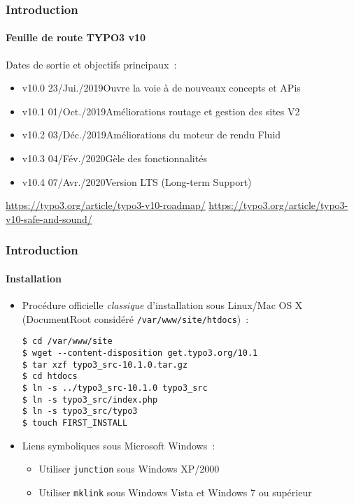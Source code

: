 
\begin{frame}[fragile]
	\frametitle{Introduction}
	\framesubtitle{Feuille de route TYPO3 v10}

	Dates de sortie et objectifs principaux~:

	\begin{itemize}

		\item v10.0 \tabto{1.1cm}23/Jui./2019\tabto{3.4cm}Ouvre la voie à de nouveaux concepts et APis
		\item
			\begingroup
				\color{typo3orange}
				v10.1 \tabto{1.1cm}01/Oct./2019\tabto{3.4cm}Améliorations routage et gestion des sites V2
			\endgroup
		\item v10.2 \tabto{1.1cm}03/Déc./2019\tabto{3.4cm}Améliorations du moteur de rendu Fluid
		\item v10.3 \tabto{1.1cm}04/Fév./2020\tabto{3.4cm}Gèle des fonctionnalités
		\item v10.4 \tabto{1.1cm}07/Avr./2020\tabto{3.4cm}Version LTS (Long-term Support)

	\end{itemize}

	\smaller
		\url{https://typo3.org/article/typo3-v10-roadmap/}\newline
		\url{https://typo3.org/article/typo3-v10-safe-and-sound/}
	\normalsize

\end{frame}


\begin{frame}[fragile]
	\frametitle{Introduction}
	\framesubtitle{Installation}

	\begin{itemize}
		\item Procédure officielle \textit{classique} d'installation sous Linux/Mac OS X\newline
			(DocumentRoot considéré \texttt{/var/www/site/htdocs})~:
		\begin{lstlisting}
$ cd /var/www/site
$ wget --content-disposition get.typo3.org/10.1
$ tar xzf typo3_src-10.1.0.tar.gz
$ cd htdocs
$ ln -s ../typo3_src-10.1.0 typo3_src
$ ln -s typo3_src/index.php
$ ln -s typo3_src/typo3
$ touch FIRST_INSTALL
		\end{lstlisting}

		\item Liens symboliques sous Microsoft Windows~:

			\begin{itemize}
				\item Utiliser \texttt{junction} sous Windows XP/2000
				\item Utiliser \texttt{mklink} sous Windows Vista et Windows 7 ou supérieur
			\end{itemize}

	\end{itemize}
\end{frame}

